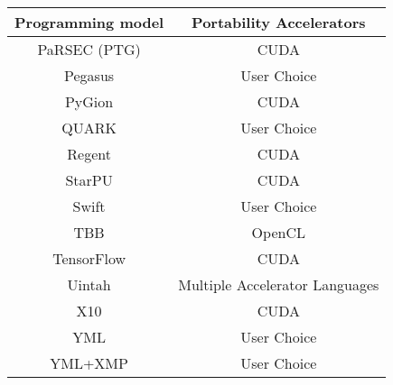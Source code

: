 \begin{tabular}{cc}
\hline
Programming model & Portability Accelerators \\
\hline
PaRSEC (PTG) & CUDA\\
Pegasus & User Choice\\
PyGion & CUDA\\
QUARK & User Choice\\
Regent & CUDA\\
StarPU & CUDA\\
Swift & User Choice\\
TBB & OpenCL\\
TensorFlow & CUDA\\
Uintah & Multiple Accelerator Languages\\
X10 & CUDA\\
YML & User Choice\\
YML+XMP & User Choice\\
\hline
\end{tabular}
